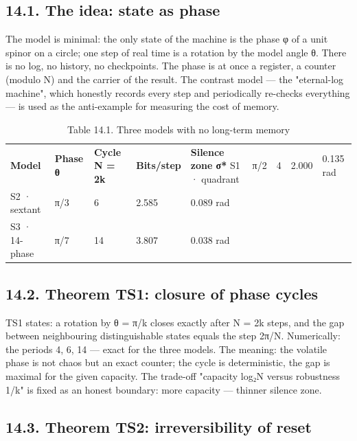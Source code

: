 \documentclass[11pt,a4paper]{article}
\begin{document}
\subsection{14.1. The idea: state as phase}

The model is minimal: the only state of the machine is the phase φ of a unit spinor on a circle; one step of real time is a rotation by the model angle θ. There is no log, no history, no checkpoints. The phase is at once a register, a counter (modulo N) and the carrier of the result. The contrast model — the "eternal-log machine", which honestly records every step and periodically re-checks everything — is used as the anti-example for measuring the cost of memory.

\begin{table}[htbp]\centering\small
\caption{Table 14.1. Three models with no long-term memory}
\begin{tabular}{p{} p{} p{} p{} p{}}
\toprule
\textbf{Model} & \textbf{Phase θ} & \textbf{Cycle N = 2k} & \textbf{Bits/step} & \textbf{Silence zone σ*}
\midrule
S1 · quadrant & π/2 & 4 & 2.000 & 0.135 rad \\
S2 · sextant & π/3 & 6 & 2.585 & 0.089 rad \\
S3 · 14-phase & π/7 & 14 & 3.807 & 0.038 rad \\
\bottomrule
\end{tabular}
\end{table}

\subsection{14.2. Theorem TS1: closure of phase cycles}

TS1 states: a rotation by θ = π/k closes exactly after N = 2k steps, and the gap between neighbouring distinguishable states equals the step 2π/N. Numerically: the periods 4, 6, 14 — exact for the three models. The meaning: the volatile phase is not chaos but an exact counter; the cycle is deterministic, the gap is maximal for the given capacity. The trade-off "capacity log₂N versus robustness 1/k" is fixed as an honest boundary: more capacity — thinner silence zone.

\subsection{14.3. Theorem TS2: irreversibility of reset}
\end{document}

